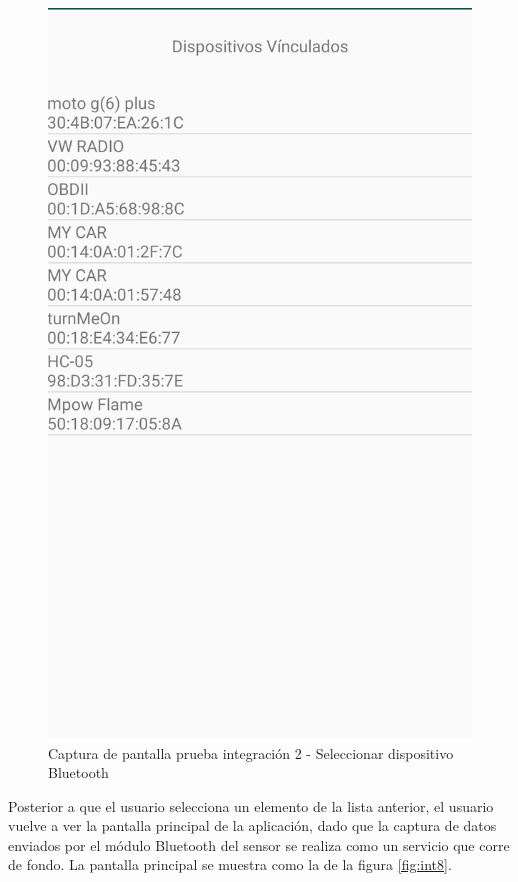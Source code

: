 \begin{figure}[H]
	\centering
	\includegraphics[scale=.2]{Capitulo6/integracion/software/images/7}
	\caption{Captura de pantalla prueba integración 2 - Seleccionar dispositivo Bluetooth}
	\label{fig:int7}
\end{figure}

Posterior a que el usuario selecciona un elemento de la lista anterior, el usuario vuelve a ver la pantalla principal de la aplicación, dado que la captura de datos enviados por el módulo Bluetooth del sensor se realiza como un servicio que corre de fondo. La pantalla principal se muestra como la de la figura \ref{fig:int8}.

